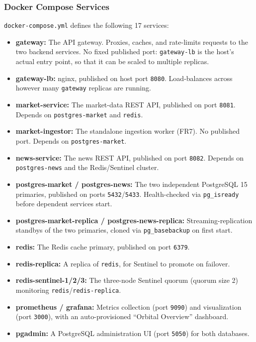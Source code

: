 \documentclass{scrartcl}
\begin{document}
\subsubsection{Docker Compose Services}\label{deployment-services}

\texttt{docker-compose.yml} defines the following 17 services:

\begin{itemize}
  \item \textbf{gateway:} The API gateway. Proxies, caches, and rate-limits requests to the two
  backend services. No fixed published port: \texttt{gateway-lb} is the host's actual entry
  point, so that it can be scaled to multiple replicas.
  \item \textbf{gateway-lb:} nginx, published on host port \texttt{8080}. Load-balances across
  however many \texttt{gateway} replicas are running.
  \item \textbf{market-service:} The market-data REST API, published on port \texttt{8081}.
  Depends on \texttt{postgres-market} and \texttt{redis}.
  \item \textbf{market-ingestor:} The standalone ingestion worker (FR7). No published port.
  Depends on \texttt{postgres-market}.
  \item \textbf{news-service:} The news REST API, published on port \texttt{8082}. Depends on
  \texttt{postgres-news} and the Redis/Sentinel cluster.
  \item \textbf{postgres-market / postgres-news:} The two independent PostgreSQL 15 primaries,
  published on ports \texttt{5432}/\texttt{5433}. Health-checked via \texttt{pg\_isready} before
  dependent services start.
  \item \textbf{postgres-market-replica / postgres-news-replica:} Streaming-replication standbys
  of the two primaries, cloned via \texttt{pg\_basebackup} on first start.
  \item \textbf{redis:} The Redis cache primary, published on port \texttt{6379}.
  \item \textbf{redis-replica:} A replica of \texttt{redis}, for Sentinel to promote on failover.
  \item \textbf{redis-sentinel-1/2/3:} The three-node Sentinel quorum (quorum size 2) monitoring
  \texttt{redis}/\texttt{redis-replica}.
  \item \textbf{prometheus / grafana:} Metrics collection (port \texttt{9090}) and visualization
  (port \texttt{3000}), with an auto-provisioned ``Orbital Overview'' dashboard.
  \item \textbf{pgadmin:} A PostgreSQL administration UI (port \texttt{5050}) for both databases.
\end{itemize}
\end{document}
